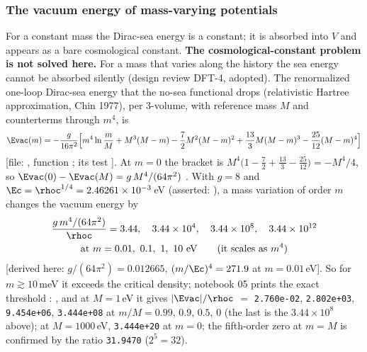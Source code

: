 \subsubsection{The vacuum energy of mass-varying potentials}
\label{sec:4.5.11}

For a constant mass the Dirac-sea energy is a constant; it is absorbed into $V$ and appears as a bare
cosmological constant. \textbf{The cosmological-constant problem is not solved here.} For a mass that
varies along the history the sea energy cannot be absorbed silently (design review DFT-4, adopted). The
renormalized one-loop Dirac-sea energy that the no-sea functional drops (relativistic Hartree
approximation, Chin 1977), per 3-volume, with reference mass $M$ and counterterms through $m^4$, is
\[
  \Evac(m)=-\frac{g}{16\pi^2}\Bigl[m^4\ln\frac mM+M^3(M-m)-\frac72M^2(M-m)^2+\frac{13}{3}M(M-m)^3-\frac{25}{12}(M-m)^4\Bigr]
\]
[file: , function ; its test
]. At $m=0$ the
bracket is $M^4\bigl(1-\tfrac72+\tfrac{13}{3}-\tfrac{25}{12}\bigr)=-M^4/4$, so
$\Evac(0)-\Evac(M)=g\,M^4/(64\pi^2)$ \cfderived. With $g=8$ and $\Ec=\rhoc^{1/4}=2.46261\times10^{-3}$\,eV
(asserted: ), a mass variation of order $m$ changes the vacuum energy by
\begin{gather*}
  \frac{g\,m^4/(64\pi^2)}{\rhoc}=3.44,\quad 3.44\times10^{4},\quad 3.44\times10^{8},\quad 3.44\times10^{12}\\
  \text{at } m=0.01,\ 0.1,\ 1,\ 10\ \text{eV}\qquad\text{(it scales as $m^4$)}
\end{gather*}
[derived here: $g/(64\pi^2)=0.012665$, $(m/\Ec)^4=271.9$ at $m=0.01$\,eV]. So for $m\gtrsim10$\,meV it
exceeds the critical density; notebook 05 prints the exact threshold :
,
and at $M=1$\,eV it gives $|\Evac|/\rhoc$ $=$ \texttt{2.760e-02}, \texttt{2.802e+03}, \texttt{9.454e+06},
\texttt{3.444e+08} at $m/M=0.99$, $0.9$, $0.5$, $0$ (the last is the $3.44\times10^{8}$ above); at
$M=1000$\,eV, \texttt{3.444e+20} at $m=0$; the fifth-order zero at $m=M$ is confirmed by the ratio
\texttt{31.9470} ($2^5=32$).

